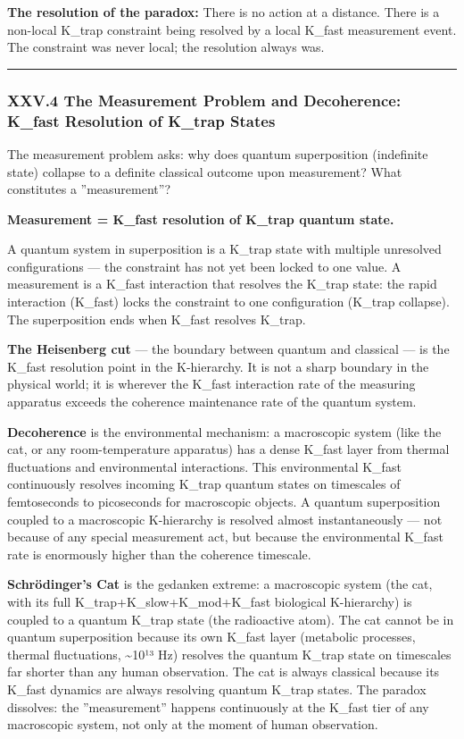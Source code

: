 \documentclass[12pt,a4paper]{article}
\begin{document}
\textbf{The resolution of the paradox:} There is no action at a distance. There is a non-local K\_trap constraint being resolved by a local K\_fast measurement event. The constraint was never local; the resolution always was.

\begin{center}
\rule{0.5\textwidth}{0.4pt}
\end{center}

\subsubsection{XXV.4 The Measurement Problem and Decoherence: K\_fast Resolution of K\_trap States}

The measurement problem asks: why does quantum superposition (indefinite state) collapse to a definite classical outcome upon measurement? What constitutes a ''measurement''?

\textbf{Measurement = K\_fast resolution of K\_trap quantum state.}

A quantum system in superposition is a K\_trap state with multiple unresolved configurations --- the constraint has not yet been locked to one value. A measurement is a K\_fast interaction that resolves the K\_trap state: the rapid interaction (K\_fast) locks the constraint to one configuration (K\_trap collapse). The superposition ends when K\_fast resolves K\_trap.

\textbf{The Heisenberg cut} --- the boundary between quantum and classical --- is the K\_fast resolution point in the K-hierarchy. It is not a sharp boundary in the physical world; it is wherever the K\_fast interaction rate of the measuring apparatus exceeds the coherence maintenance rate of the quantum system.

\textbf{Decoherence} is the environmental mechanism: a macroscopic system (like the cat, or any room-temperature apparatus) has a dense K\_fast layer from thermal fluctuations and environmental interactions. This environmental K\_fast continuously resolves incoming K\_trap quantum states on timescales of femtoseconds to picoseconds for macroscopic objects. A quantum superposition coupled to a macroscopic K-hierarchy is resolved almost instantaneously --- not because of any special measurement act, but because the environmental K\_fast rate is enormously higher than the coherence timescale.

\textbf{Schrödinger's Cat} is the gedanken extreme: a macroscopic system (the cat, with its full K\_trap+K\_slow+K\_mod+K\_fast biological K-hierarchy) is coupled to a quantum K\_trap state (the radioactive atom). The cat cannot be in quantum superposition because its own K\_fast layer (metabolic processes, thermal fluctuations, \textasciitilde{}10¹³ Hz) resolves the quantum K\_trap state on timescales far shorter than any human observation. The cat is always classical because its K\_fast dynamics are always resolving quantum K\_trap states. The paradox dissolves: the ''measurement'' happens continuously at the K\_fast tier of any macroscopic system, not only at the moment of human observation.
\end{document}
